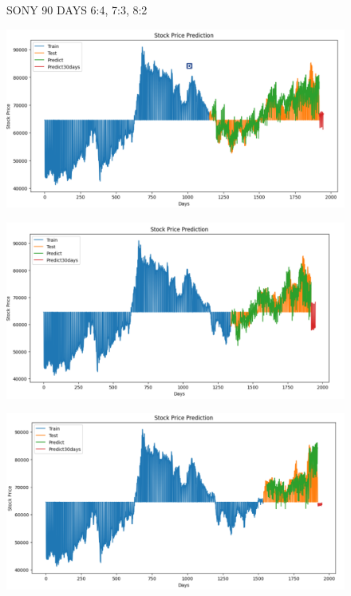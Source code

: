 \documentclass{article}
\begin{document}
\begin{multicols}{2}
\begin{figure}[H]
\begin{minipage}{0.15\textwidth}
    \label{fig:3}
    \end{minipage}
    \caption{SONY 90 DAYS  6:4, 7:3, 8:2 }
\end{figure}


\begin{figure}[H]
    \centering
    \begin{minipage}{0.15\textwidth}
    \centering
    \includegraphics[width=1\textwidth]{Image/N_Beat/N_BEAT_6_4_SAMSUNG_30DAYS.png}
   
    \label{fig:1}
    \end{minipage}%
    \begin{minipage}{0.15\textwidth}
    \centering
    \includegraphics[width=1\textwidth]{Image/N_Beat/N_BEAT_7_3_SAMSUNG_30DAYS.png}
  
    \label{fig:2}
    \end{minipage}%
    \begin{minipage}{0.15\textwidth}
    \centering
    \includegraphics[width=1\textwidth]{Image/N_Beat/N_BEAT_8_2_SAMSUNG_30DAYS.png}


\end{minipage}
\end{figure}
\end{multicols}
\end{document}
